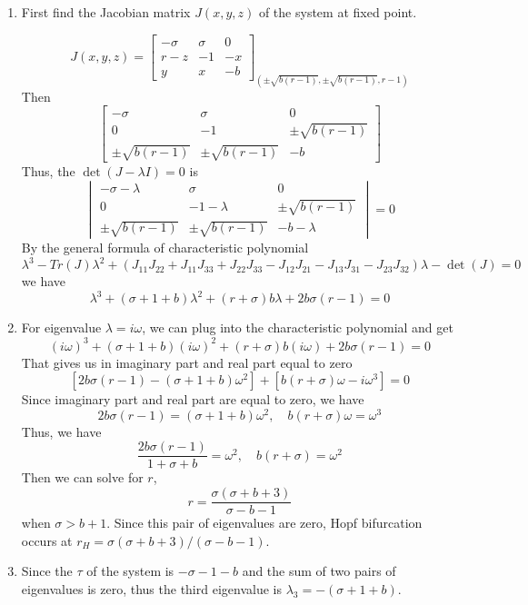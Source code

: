 \documentclass[12pt]{exam}
\begin{document}
\begin{enumerate}
	\item First find the Jacobian matrix $J(x,y,z)$ of the system at fixed point.

	\[ J(x,y,z) = \begin{bmatrix}
		-\sigma & \sigma & 0 \\
		r-z & -1 & -x \\
		y & x & -b
	\end{bmatrix}_{(\pm \sqrt{b(r-1)}, \pm \sqrt{b(r-1)}, r-1)} \]
	Then
	\[ \begin{bmatrix}
		-\sigma & \sigma & 0 \\
		0 & -1 & \pm \sqrt{b(r-1)} \\
		\pm \sqrt{b(r-1)} & \pm \sqrt{b(r-1)} & -b
	\end{bmatrix} \]
	Thus, the $\det(J - \lambda I) = 0$ is	
	\[ \begin{vmatrix}
		-\sigma - \lambda & \sigma & 0 \\
		0 & -1 - \lambda & \pm \sqrt{b(r-1)} \\
		\pm \sqrt{b(r-1)} & \pm \sqrt{b(r-1)} & -b - \lambda
	\end{vmatrix} = 0 \]
	By the general formula of characteristic polynomial
	\[ \lambda^3 - Tr(J)\lambda^2 + (J_{11}J_{22} + J_{11}J_{33} + J_{22}J_{33} - J_{12}J_{21} - J_{13}J_{31} - J_{23}J_{32})\lambda - \det(J) = 0 \]
	we have
	\[ \lambda^3 + (\sigma + 1 + b)\lambda^2 + (r+\sigma)b\lambda + 2b\sigma (r-1) = 0 \]

	\item For eigenvalue $\lambda = i \omega$, we can plug into the characteristic polynomial and get
	\[ (i\omega)^3 + (\sigma + 1 + b)(i\omega)^2 + (r+\sigma)b(i\omega) + 2b\sigma (r-1) = 0 \]
	That gives us in imaginary part and real part equal to zero
	\[ [2b\sigma (r-1) - (\sigma + 1 + b)\omega^2] + [b(r+\sigma)\omega - i \omega^3] = 0 \]
	Since imaginary part and real part are equal to zero, we have
	\[ 2b\sigma (r-1) = (\sigma + 1 + b)\omega^2, \quad b(r+\sigma)\omega = \omega^3  \]
	Thus, we have
	\[ \frac{2b\sigma (r-1)}{1+\sigma+b} = \omega^2, \quad b(r+\sigma) = \omega^2 \]
	Then we can solve for $r$,
	\[ r = \frac{\sigma (\sigma + b + 3)}{\sigma - b - 1} \]
	when $\sigma > b + 1$. Since this pair of eigenvalues are zero, Hopf bifurcation occurs at $r_H = \sigma (\sigma + b + 3)/(\sigma - b - 1)$.

	\item Since the $\tau$ of the system is $-\sigma - 1 - b$ and the sum of two pairs of eigenvalues is zero, thus the third eigenvalue is $\lambda_3 = -(\sigma + 1 + b)$. 




\end{enumerate}
\end{document}
